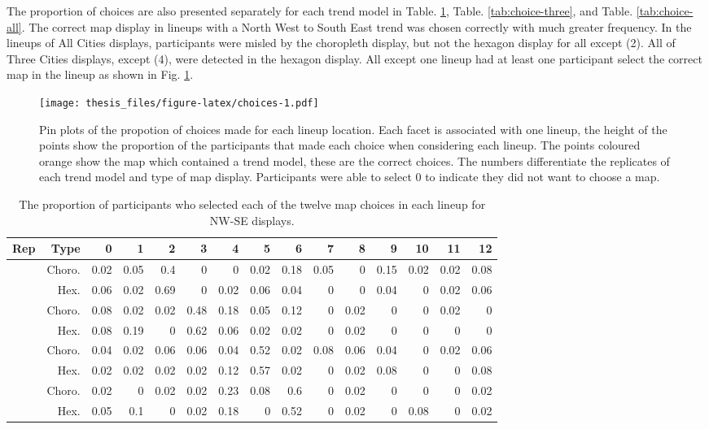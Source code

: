 \documentclass{monashthesis}
\begin{document}
The proportion of choices are also presented separately for each trend model in Table. \ref{tab:choice-nwse}, Table. \ref{tab:choice-three}, and Table. \ref{tab:choice-all}.
The correct map display in lineups with a North West to South East trend was chosen correctly with much greater frequency.
In the lineups of All Cities displays, participants were misled by the choropleth display, but not the hexagon display for all except (2).
All of Three Cities displays, except (4), were detected in the hexagon display. All except one lineup had at least one participant select the correct map in the lineup as shown in Fig. \ref{fig:choices}.

\begin{figure}
\centering
\texttt{[image: thesis\_files/figure-latex/choices-1.pdf]}
\caption{\label{fig:choices}Pin plots of the propotion of choices made for each lineup location. Each facet is associated with one lineup, the height of the points show the proportion of the participants that made each choice when considering each lineup. The points coloured orange show the map which contained a trend model, these are the correct choices. The numbers differentiate the replicates of each trend model and type of map display. Participants were able to select 0 to indicate they did not want to choose a map.}
\end{figure}

\begin{table}

\caption{\label{tab:choice-nwse}The proportion of participants who selected each of the twelve map choices in each lineup for NW-SE displays.}
\centering
\begin{tabular}[t]{r|r|r|r|r|r|r|r|r|r|r|r|r|r|r}
\hline
Rep & Type & 0 & 1 & 2 & 3 & 4 & 5 & 6 & 7 & 8 & 9 & 10 & 11 & 12\\
\hline
 & Choro. & 0.02 & 0.05 & 0.4 & 0 & 0 & 0.02 & 0.18 & 0.05 & 0 & 0.15 & 0.02 & 0.02 & 0.08\\
\cline{2-15}
\multirow{-2}{*}{\raggedleft\arraybackslash 1} & Hex. & 0.06 & 0.02 & 0.69 & 0 & 0.02 & 0.06 & 0.04 & 0 & 0 & 0.04 & 0 & 0.02 & 0.06\\
\cline{1-15}
 & Choro. & 0.08 & 0.02 & 0.02 & 0.48 & 0.18 & 0.05 & 0.12 & 0 & 0.02 & 0 & 0 & 0.02 & 0\\
\cline{2-15}
\multirow{-2}{*}{\raggedleft\arraybackslash 2} & Hex. & 0.08 & 0.19 & 0 & 0.62 & 0.06 & 0.02 & 0.02 & 0 & 0.02 & 0 & 0 & 0 & 0\\
\cline{1-15}
 & Choro. & 0.04 & 0.02 & 0.06 & 0.06 & 0.04 & 0.52 & 0.02 & 0.08 & 0.06 & 0.04 & 0 & 0.02 & 0.06\\
\cline{2-15}
\multirow{-2}{*}{\raggedleft\arraybackslash 3} & Hex. & 0.02 & 0.02 & 0.02 & 0.02 & 0.12 & 0.57 & 0.02 & 0 & 0.02 & 0.08 & 0 & 0 & 0.08\\
\cline{1-15}
 & Choro. & 0.02 & 0 & 0.02 & 0.02 & 0.23 & 0.08 & 0.6 & 0 & 0.02 & 0 & 0 & 0 & 0.02\\
\cline{2-15}
\multirow{-2}{*}{\raggedleft\arraybackslash 4} & Hex. & 0.05 & 0.1 & 0 & 0.02 & 0.18 & 0 & 0.52 & 0 & 0.02 & 0 & 0.08 & 0 & 0.02\\
\hline
\end{tabular}
\end{table}
\end{document}
